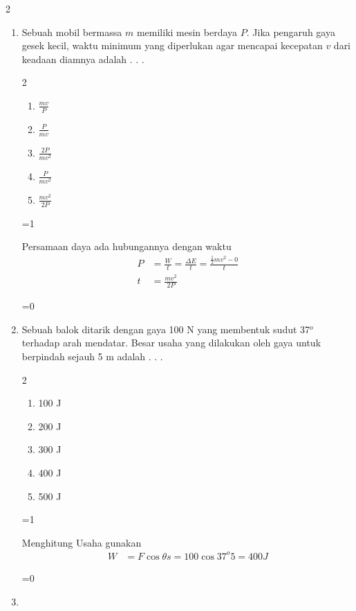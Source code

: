 \documentclass[10pt,a4paper]{article}
\def\tampilkunci{1}
\newcommand{\hide}[1]{\ifnum\tampilkunci=1
%
\begin{mybox}
 #1
\end{mybox}
%
\vspace{\baselineskip}\fi\ifnum\tampilkunci=0
%
%
\fi}
\newcommand{\pilgani}[1]{                            \vspace{-0.3cm}\begin{multicols}{2}
 \begin{enumerate}[label=\Alph*., itemsep=0pt,topsep=0pt,leftmargin=*,align=Center]#1                     \end{enumerate}
 \phantom{ini cuma sapi, wedus, dan ayam}
 \end{multicols}}
\begin{document}
\begin{multicols*}{2}
\begin{enumerate}
\item Sebuah mobil bermassa $m$ memiliki mesin berdaya $P$. Jika pengaruh gaya gesek kecil, waktu minimum yang diperlukan agar mencapai kecepatan $v$ dari keadaan diamnya adalah . . .
\pilgani{
	\item $\frac{mv}{P}$
	\item $\frac{P}{mv}$
	\item $\frac{2P}{mv^2}$
	\item $\frac{P}{mv^2}$
	\item $\frac{mv^2}{2P}$
	}
\hide{ Persamaan daya ada hubungannya dengan waktu
	\begin{align*}
	P&=\frac{W}{t}=\frac{\Delta E}{t}=\frac{\frac{1}{2}mv^2-0}{t}\\
	t&=\frac{mv^2}{2P}
	\end{align*}
	}
	
\item Sebuah balok ditarik dengan gaya 100 N yang membentuk sudut 37$^o$ terhadap arah mendatar. Besar usaha yang dilakukan oleh gaya untuk berpindah sejauh 5 m adalah . . . 
\pilgani{
	\item 100 J
	\item 200 J
	\item 300 J
	\item 400 J
	\item 500 J
	}
\hide{
        Menghitung Usaha gunakan
        \begin{align*}
        W&=F \cos \theta s = 100 \cos 37^o 5 = 400 J
        \end{align*}}




\item 
\end{enumerate}
\end{multicols*} 
\end{document}
